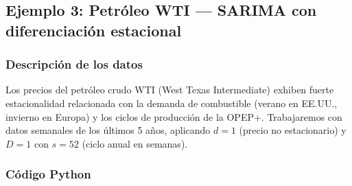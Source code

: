 \documentclass[12pt,a4paper]{article}
\begin{document}
\subsection{Ejemplo 3: Petróleo WTI --- SARIMA con diferenciación estacional}

\subsubsection{Descripción de los datos}

Los precios del petróleo crudo WTI (West Texas Intermediate) exhiben fuerte estacionalidad
relacionada con la demanda de combustible (verano en EE.UU., invierno en Europa) y los ciclos
de producción de la OPEP+. Trabajaremos con datos semanales de los últimos 5 años,
aplicando $d=1$ (precio no estacionario) y $D=1$ con $s=52$ (ciclo anual en semanas).

\subsubsection{Código Python}
\end{document}
